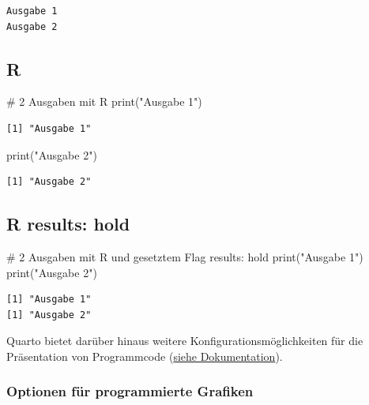 \documentclass[
  letterpaper,
  DIV=11]{scrartcl}
\newenvironment{Shaded}{\begin{snugshade}}{\end{snugshade}}
\newcommand{\CommentTok}[1]{\textcolor[rgb]{0.37,0.37,0.37}{#1}}
\newcommand{\FunctionTok}[1]{\textcolor[rgb]{0.28,0.35,0.67}{#1}}
\newcommand{\NormalTok}[1]{\textcolor[rgb]{0.00,0.23,0.31}{#1}}
\newcommand{\StringTok}[1]{\textcolor[rgb]{0.13,0.47,0.30}{#1}}
\begin{document}
\begin{verbatim}
Ausgabe 1
Ausgabe 2
\end{verbatim}

\subsection{R}

\begin{Shaded}
\begin{Highlighting}[]
\CommentTok{\# 2 Ausgaben mit R}
\FunctionTok{print}\NormalTok{(}\StringTok{"Ausgabe 1"}\NormalTok{)}
\end{Highlighting}
\end{Shaded}

\begin{verbatim}
[1] "Ausgabe 1"
\end{verbatim}

\begin{Shaded}
\begin{Highlighting}[]
\FunctionTok{print}\NormalTok{(}\StringTok{"Ausgabe 2"}\NormalTok{)}
\end{Highlighting}
\end{Shaded}

\begin{verbatim}
[1] "Ausgabe 2"
\end{verbatim}

\subsection{R results: hold}

\begin{Shaded}
\begin{Highlighting}[]
\CommentTok{\# 2 Ausgaben mit R und gesetztem Flag results: hold}
\FunctionTok{print}\NormalTok{(}\StringTok{"Ausgabe 1"}\NormalTok{)}
\FunctionTok{print}\NormalTok{(}\StringTok{"Ausgabe 2"}\NormalTok{)}
\end{Highlighting}
\end{Shaded}

\begin{verbatim}
[1] "Ausgabe 1"
[1] "Ausgabe 2"
\end{verbatim}

Quarto bietet darüber hinaus weitere Konfigurationsmöglichkeiten für die
Präsentation von Programmcode
(\href{https://quarto.org/docs/output-formats/html-code.html\#overview}{siehe
Dokumentation}).

\subsubsection{Optionen für programmierte
Grafiken}\label{optionen-fuxfcr-programmierte-grafiken}
\end{document}
